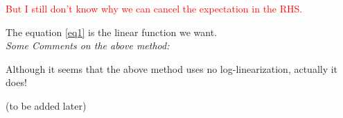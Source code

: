 \documentclass{book}
\theoremstyle{plain}
\theoremstyle{definition}
\begin{document}
\textcolor{red}
{But I still don't know why we can cancel the expectation in the RHS.}

The equation \ref{eq1} is the linear function we want.\\

\noindent
\emph{Some Comments on the above method:}

Although it seems that the above method uses no log-linearization,
actually it does!

(to be added later)





\renewcommand\refname{Reference}


\end{document}
